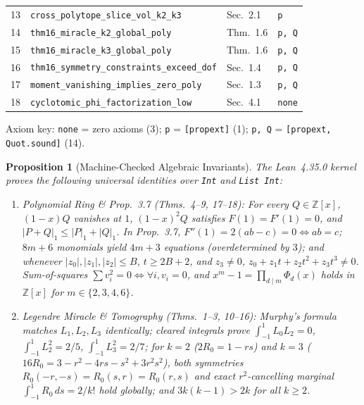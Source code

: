 \documentclass[10pt,twocolumn]{article}
\newtheorem{proposition}{Proposition}
\begin{document}
\begin{table}[t]
\begin{tabular}{@{}rlll@{}}
13 & \texttt{cross\_polytope\_slice\_vol\_k2\_k3} & Sec.~2.1 & \texttt{p} \\
14 & \texttt{thm16\_miracle\_k2\_global\_poly} & Thm.~1.6 & \texttt{p, Q} \\
15 & \texttt{thm16\_miracle\_k3\_global\_poly} & Thm.~1.6 & \texttt{p, Q} \\
16 & \texttt{thm16\_symmetry\_constraints\_exceed\_dof} & Sec.~1.4 & \texttt{p, Q} \\
17 & \texttt{moment\_vanishing\_implies\_zero\_poly} & Sec.~1.3 & \texttt{p, Q} \\
18 & \texttt{cyclotomic\_phi\_factorization\_low} & Sec.~4.1 & \texttt{none} \\
\bottomrule
\end{tabular}
\vspace{-0.4em}
\begin{flushleft}
\tiny Axiom key: \texttt{none} = zero axioms (3); \texttt{p} = \texttt{[propext]} (1); \texttt{p, Q} = \texttt{[propext, Quot.sound]} (14).
\end{flushleft}
\vspace{-0.8em}
\end{table}

\begin{proposition}[Machine-Checked Algebraic Invariants]\label{prop:lean}
The Lean~4.35.0 kernel proves the following universal identities over \texttt{Int} and \texttt{List Int}:
\begin{enumerate}[leftmargin=*,nosep]
  \item \emph{Polynomial Ring \& Prop.~3.7 (Thms.~4--9, 17--18):} For every $Q \in \mathbb{Z}[x]$, $(1-x)Q$ vanishes at $1$, $(1-x)^2 Q$ satisfies $F(1) = F'(1) = 0$, and $|P+Q|_1 \le |P|_1 + |Q|_1$. In Prop.~3.7, $F''(1) = 2(ab-c) = 0 \iff ab=c$; $8m+6$ monomials yield $4m+3$ equations (overdetermined by $3$); and whenever $|z_0|,|z_1|,|z_2| \le B$, $t \ge 2B+2$, and $z_3 \neq 0$, $z_0 + z_1 t + z_2 t^2 + z_3 t^3 \neq 0$. Sum-of-squares $\sum v_i^2 = 0 \iff \forall i, v_i = 0$, and $x^m - 1 = \prod_{d\mid m}\Phi_d(x)$ holds in $\mathbb{Z}[x]$ for $m \in \{2,3,4,6\}$.
  \item \emph{Legendre Miracle \& Tomography (Thms.~1--3, 10--16):} Murphy's formula matches $L_1, L_2, L_3$ identically; cleared integrals prove $\int_{-1}^1 L_0 L_2 = 0$, $\int_{-1}^1 L_2^2 = 2/5$, $\int_{-1}^1 L_3^2 = 2/7$; for $k=2$ ($2R_0 = 1-rs$) and $k=3$ ($16R_0 = 3 - r^2 - 4rs - s^2 + 3r^2s^2$), both symmetries $R_0(-r,-s) = R_0(s,r) = R_0(r,s)$ and exact $r^2$-cancelling marginal $\int_{-1}^1 R_0\,ds = 2/k!$ hold globally; and $3k(k-1) > 2k$ for all $k \ge 2$.
\end{enumerate}
\end{proposition}
\end{document}

